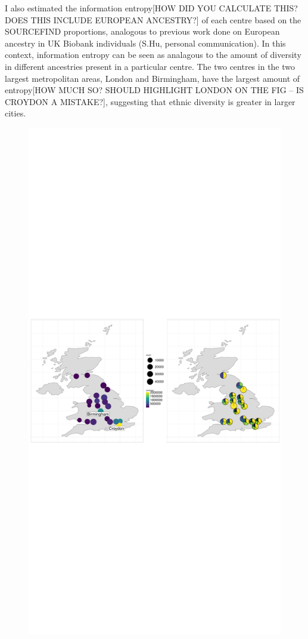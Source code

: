 I also estimated the information entropy{\color{red}[HOW DID YOU CALCULATE THIS? DOES THIS INCLUDE EUROPEAN ANCESTRY?]} of each centre based on the SOURCEFIND proportions, {\color{red}analogous to previous work done on European ancestry in UK Biobank individuals (S.Hu, personal communication)}. In this context, information entropy can be seen as analagous to the amount of diversity in different ancestries present in a particular centre. The two centres in the two largest metropolitan areas, London and Birmingham, have the largest amount of entropy{\color{red}[HOW MUCH SO? SHOULD HIGHLIGHT LONDON ON THE FIG -- IS CROYDON A MISTAKE?]}, suggesting that ethnic diversity is greater in larger cities.

\begin{figure}
    \centering
    \includegraphics[width=1.0\textwidth]{../images/chapter3/SF_props_pie_chart.pdf}

\end{figure}
